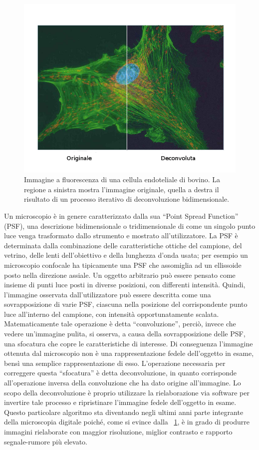 \begin{figure}
 \centering
 \includegraphics[scale=.60]{img/CAP2decon.png}
 \caption{\small{Immagine a fluorescenza di una cellula endoteliale di bovino. La regione a sinistra mostra l'immagine originale, quella a destra il risultato di un processo iterativo di deconvoluzione bidimensionale.}}
 \label{fig:decon}
\end{figure}

Un microscopio è in genere caratterizzato dalla sua ``Point Spread Function'' (PSF), una descrizione bidimensionale o tridimensionale di come un singolo punto luce venga trasformato dallo strumento e mostrato all'utilizzatore. 
La PSF è determinata dalla combinazione delle caratteristiche ottiche del campione, del vetrino, delle lenti dell'obiettivo e della lunghezza d'onda usata; per esempio un microscopio confocale ha tipicamente una PSF che assomiglia ad un ellissoide posto nella direzione assiale.
Un oggetto arbitrario può essere pensato come insieme di punti luce posti in diverse posizioni, con differenti intensità. 
Quindi, l'immagine osservata dall'utilizzatore può essere descritta come una sovrapposizione di varie PSF, ciascuna nella posizione del corrispondente punto luce all'interno del campione, con intensità opportunatamente scalata.
Matematicamente tale operazione è detta ``convoluzione'', perciò, invece che vedere un'immagine pulita, si osserva, a causa della sovrapposizione delle PSF, una sfocatura che copre le caratteristiche di interesse. 
Di conseguenza l'immagine ottenuta dal microscopio non è una rappresentazione fedele dell'oggetto in esame, bensì una semplice rappresentazione di esso.
L'operazione necessaria per correggere questa ``sfocatura'' è detta deconvoluzione, in quanto corrisponde all'operazione inversa della convoluzione che ha dato origine all'immagine.
Lo scopo della deconvoluzione è proprio utilizzare la rielaborazione via software per invertire tale processo e ripristinare l'immagine fedele dell'oggetto in esame. 
Questo particolare algoritmo sta diventando negli ultimi anni parte integrante della microscopia digitale poiché, come si evince dalla \figurename~\ref{fig:decon}, è in grado di produrre immagini rielaborate con maggior risoluzione, miglior contrasto e rapporto segnale-rumore più elevato.

